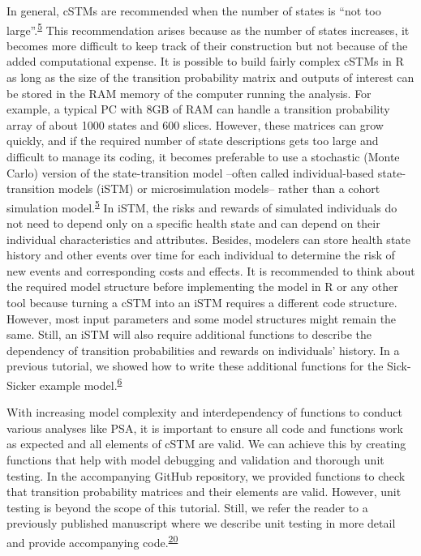 \documentclass[
]{article}
\begin{document}
In general, cSTMs are recommended when the number of states is ``not too large''.\textsuperscript{\protect\hyperlink{ref-Siebert2012c}{5}} This recommendation arises because as the number of states increases, it becomes more difficult to keep track of their construction but not because of the added computational expense. It is possible to build fairly complex cSTMs in R as long as the size of the transition probability matrix and outputs of interest can be stored in the RAM memory of the computer running the analysis. For example, a typical PC with 8GB of RAM can handle a transition probability array of about 1000 states and 600 slices. However, these matrices can grow quickly, and if the required number of state descriptions gets too large and difficult to manage its coding, it becomes preferable to use a stochastic (Monte Carlo) version of the state-transition model --often called individual-based state-transition models (iSTM) or microsimulation models-- rather than a cohort simulation model.\textsuperscript{\protect\hyperlink{ref-Siebert2012c}{5}} In iSTM, the risks and rewards of simulated individuals do not need to depend only on a specific health state and can depend on their individual characteristics and attributes. Besides, modelers can store health state history and other events over time for each individual to determine the risk of new events and corresponding costs and effects. It is recommended to think about the required model structure before implementing the model in R or any other tool because turning a cSTM into an iSTM requires a different code structure. However, most input parameters and some model structures might remain the same. Still, an iSTM will also require additional functions to describe the dependency of transition probabilities and rewards on individuals' history. In a previous tutorial, we showed how to write these additional functions for the Sick-Sicker example model.\textsuperscript{\protect\hyperlink{ref-Krijkamp2018}{6}}

With increasing model complexity and interdependency of functions to conduct various analyses like PSA, it is important to ensure all code and functions work as expected and all elements of cSTM are valid. We can achieve this by creating functions that help with model debugging and validation and thorough unit testing. In the accompanying GitHub repository, we provided functions to check that transition probability matrices and their elements are valid. However, unit testing is beyond the scope of this tutorial. Still, we refer the reader to a previously published manuscript where we describe unit testing in more detail and provide accompanying code.\textsuperscript{\protect\hyperlink{ref-Alarid-Escudero2019e}{20}}
\end{document}
